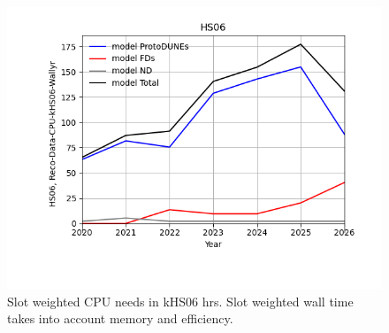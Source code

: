 \begin{figure}[h]
\centering\includegraphics[height=0.4\textwidth]{MoreSim_2022-11-21-2026/MoreSim_2022-11-21-2026-HS06.png}
\caption{Slot weighted CPU needs in kHS06 hrs. Slot weighted wall time takes into account memory and efficiency.}
\label{fig:HS06}
\end{figure}
